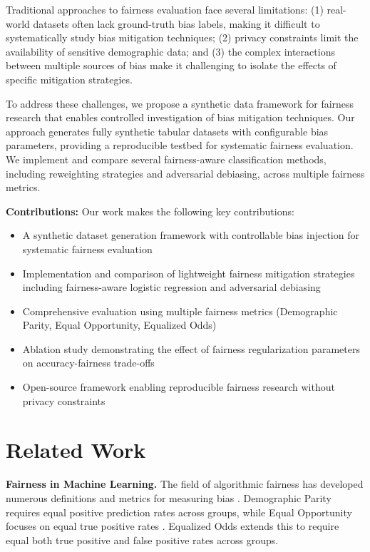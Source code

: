 \documentclass{article}
\begin{document}
Traditional approaches to fairness evaluation face several limitations: (1) real-world datasets often lack ground-truth bias labels, making it difficult to systematically study bias mitigation techniques; (2) privacy constraints limit the availability of sensitive demographic data; and (3) the complex interactions between multiple sources of bias make it challenging to isolate the effects of specific mitigation strategies.

To address these challenges, we propose a synthetic data framework for fairness research that enables controlled investigation of bias mitigation techniques. Our approach generates fully synthetic tabular datasets with configurable bias parameters, providing a reproducible testbed for systematic fairness evaluation. We implement and compare several fairness-aware classification methods, including reweighting strategies and adversarial debiasing, across multiple fairness metrics.

\textbf{Contributions:} Our work makes the following key contributions:
\begin{itemize}
\item A synthetic dataset generation framework with controllable bias injection for systematic fairness evaluation
\item Implementation and comparison of lightweight fairness mitigation strategies including fairness-aware logistic regression and adversarial debiasing
\item Comprehensive evaluation using multiple fairness metrics (Demographic Parity, Equal Opportunity, Equalized Odds)
\item Ablation study demonstrating the effect of fairness regularization parameters on accuracy-fairness trade-offs
\item Open-source framework enabling reproducible fairness research without privacy constraints
\end{itemize}

\section{Related Work}

\textbf{Fairness in Machine Learning.} The field of algorithmic fairness has developed numerous definitions and metrics for measuring bias \cite{dwork2012fairness}. Demographic Parity requires equal positive prediction rates across groups, while Equal Opportunity focuses on equal true positive rates \cite{hardt2016equality}. Equalized Odds extends this to require equal both true positive and false positive rates across groups.
\end{document}
